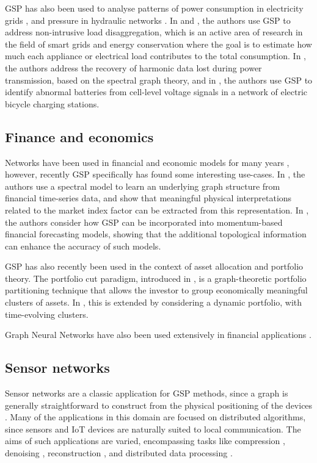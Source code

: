 GSP has also been used to analyse patterns of power consumption in electricity grids \citep{Ramakrishna2021}, and pressure in hydraulic networks \citep{Zhou2022}. In \cite{He2018} and \cite{Zheng2022}, the authors use GSP to address non-intrusive load disaggregation, which is an active area of research in the field of smart grids and energy conservation where the goal is to estimate how much each appliance or electrical load contributes to the total consumption. In \cite{Ying2022}, the authors address the recovery of harmonic data lost during power transmission, based on the spectral graph theory, and in \cite{Wang2022b}, the authors use GSP to identify abnormal batteries from cell-level voltage signals in a network of electric bicycle charging stations. 


\subsection{Finance and economics}

Networks have been used in financial and economic models for many years \citep{Marti2021}, however, recently GSP specifically has found some interesting use-cases. In \cite{Vinicius2020}, the authors use a spectral model to learn an underlying graph structure from financial time-series data, and show that meaningful physical interpretations related to the market index factor can be extracted from this representation. In \citep{Zhang2023}, the authors consider how GSP can be incorporated into momentum-based financial forecasting models, showing that the additional topological information can enhance the accuracy of such models. 

GSP has also recently been used in the context of asset allocation and portfolio theory. The portfolio cut paradigm, introduced in \citep{Dees2020}, is a graph-theoretic portfolio partitioning technique that allows the investor to group economically meaningful clusters of assets. In \citep{Arroyo2022}, this is extended by considering a dynamic portfolio, with time-evolving clusters. 

Graph Neural Networks have also been used extensively in financial applications \citep{Wang2022c}. 


\subsection{Sensor networks}

Sensor networks are a classic application for GSP methods, since a graph is generally straightforward to construct from the physical positioning of the devices \citep{Jablonski2017}. Many of the applications in this domain are focused on distributed algorithms, since sensors and IoT devices are naturally suited to local communication. The aims of such applications are varied, encompassing tasks like compression \citep{Zhu2012}, denoising \citep{Tay2021}, reconstruction \citep{Wang2015}, and distributed data processing \citep{Chi2022}. 

